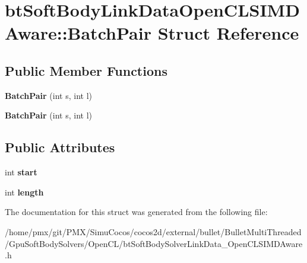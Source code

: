\hypertarget{structbtSoftBodyLinkDataOpenCLSIMDAware_1_1BatchPair}{}\section{bt\+Soft\+Body\+Link\+Data\+Open\+C\+L\+S\+I\+M\+D\+Aware\+:\+:Batch\+Pair Struct Reference}
\label{structbtSoftBodyLinkDataOpenCLSIMDAware_1_1BatchPair}
\subsection*{Public Member Functions}
\begin{DoxyCompactItemize}
\item 
\mbox{\label{structbtSoftBodyLinkDataOpenCLSIMDAware_1_1BatchPair_ac91d85b4108a08b2060ccb1e97d12189}} 
{\bfseries Batch\+Pair} (int s, int l)
\item 
\mbox{\label{structbtSoftBodyLinkDataOpenCLSIMDAware_1_1BatchPair_ac91d85b4108a08b2060ccb1e97d12189}} 
{\bfseries Batch\+Pair} (int s, int l)
\end{DoxyCompactItemize}
\subsection*{Public Attributes}
\begin{DoxyCompactItemize}
\item 
\mbox{\label{structbtSoftBodyLinkDataOpenCLSIMDAware_1_1BatchPair_a5a369244eafcaf7865f38b209062d8a2}} 
int {\bfseries start}
\item 
\mbox{\label{structbtSoftBodyLinkDataOpenCLSIMDAware_1_1BatchPair_a0a5ccf104b720f5f8537d7a6c819fd7f}} 
int {\bfseries length}
\end{DoxyCompactItemize}


The documentation for this struct was generated from the following file\+:\begin{DoxyCompactItemize}
\item 
/home/pmx/git/\+P\+M\+X/\+Simu\+Cocos/cocos2d/external/bullet/\+Bullet\+Multi\+Threaded/\+Gpu\+Soft\+Body\+Solvers/\+Open\+C\+L/bt\+Soft\+Body\+Solver\+Link\+Data\+\_\+\+Open\+C\+L\+S\+I\+M\+D\+Aware.\+h\end{DoxyCompactItemize}
